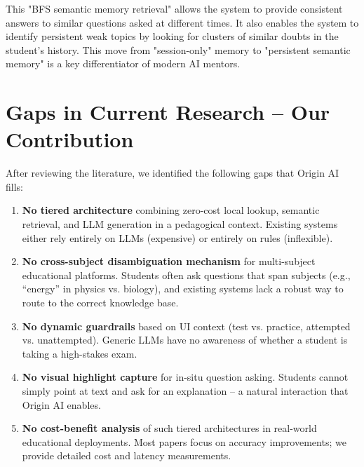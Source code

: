 This "BFS semantic memory retrieval" allows the system to provide consistent answers to similar questions asked at different times. It also enables the system to identify persistent weak topics by looking for clusters of similar doubts in the student's history. This move from "session-only" memory to "persistent semantic memory" is a key differentiator of modern AI mentors.

\section{Gaps in Current Research – Our Contribution}


After reviewing the literature, we identified the following gaps that Origin AI fills:

\begin{enumerate}
    \item \textbf{No tiered architecture} combining zero-cost local lookup, semantic retrieval, and LLM generation in a pedagogical context. Existing systems either rely entirely on LLMs (expensive) or entirely on rules (inflexible).
    \item \textbf{No cross-subject disambiguation mechanism} for multi-subject educational platforms. Students often ask questions that span subjects (e.g., ``energy'' in physics vs. biology), and existing systems lack a robust way to route to the correct knowledge base.
    \item \textbf{No dynamic guardrails} based on UI context (test vs. practice, attempted vs. unattempted). Generic LLMs have no awareness of whether a student is taking a high-stakes exam.
    \item \textbf{No visual highlight capture} for in-situ question asking. Students cannot simply point at text and ask for an explanation – a natural interaction that Origin AI enables.
    \item \textbf{No cost-benefit analysis} of such tiered architectures in real-world educational deployments. Most papers focus on accuracy improvements; we provide detailed cost and latency measurements.
\end{enumerate}
